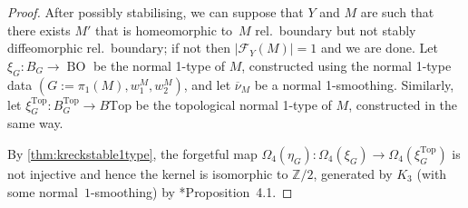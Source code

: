 \documentclass[a4paper, reqno]{amsart}
\theoremstyle{definition}
\theoremstyle{remark}
\renewcommand{\top}{\mathrm{Top}}
\newcommand{\Z}{\mathbb{Z}}
\newcommand{\ol}{\overline}
\newcommand{\Top}{\mathrm{Top}}
\DeclareMathOperator{\BO}{BO}
\begin{document}
\begin{proof}
After possibly stabilising,
we can suppose that $Y$ and $M$ are such that there exists $M'$ that is homeomorphic to~$M$ rel.\ boundary but not stably diffeomorphic rel.\ boundary; if not then  $|\mathcal{F}_Y(M)| =1$ and we are done.  
Let $\xi_G \colon B_G \to \BO$ be the normal 1-type of $M$, constructed using the normal 1-type data $(G:=\pi_1(M), w_1^M, w_2^M)$, and let $\ol{\nu}_M$ be a normal 1-smoothing. Similarly, let $\xi_G^\top \colon B^\top_G \to B\Top$ be the topological normal 1-type of $M$, constructed in the same way.

By \cref{thm:kreckstable1type}, the forgetful map $\Omega_4(\eta_G)\colon \Omega_4(\xi_G)\to\Omega_4(\xi^{\top}_G)$ is not injective and hence the kernel is isomorphic to $\Z/2$, generated by $K_3$ (with some normal~$1$-smoothing) by \cite{Kasprowski-Powell}*{Proposition~4.1}.



\end{proof}
\end{document}
